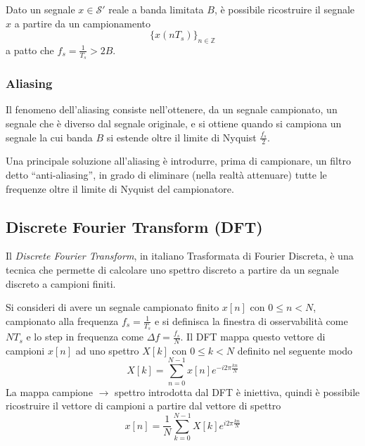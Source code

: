         \begin{theorem}
            Dato un segnale $x \in \mathcal{S}'$ reale a banda limitata $B$, è possibile ricostruire il segnale $x$ a partire da un campionamento
            \[
                \{x(n T_s)\}_{n \in \mathbb{Z}}
            \]
            a patto che $f_s = \frac{1}{T_s} > 2B$.
        \end{theorem}

        \subsubsection{Aliasing}
            Il fenomeno dell'aliasing consiste nell'ottenere, da un segnale campionato, un segnale che è diverso dal segnale originale, e si ottiene quando si campiona un segnale la cui banda $B$ si estende oltre il limite di Nyquist $\frac{f_s}{2}$.

            Una principale soluzione all'aliasing è introdurre, prima di campionare, un filtro detto ``anti-aliasing'', in grado di eliminare (nella realtà attenuare) tutte le frequenze oltre il limite di Nyquist del campionatore.


    \subsection{Discrete Fourier Transform (DFT)}
        Il \textit{Discrete Fourier Transform}, in italiano Trasformata di Fourier Discreta, è una tecnica che permette di calcolare uno spettro discreto a partire da un segnale discreto a campioni finiti.

        Si consideri di avere un segnale campionato finito $x[n]$ con $0 \leq n < N$, campionato alla frequenza $f_s = \frac{1}{T_s}$ e
        si definisca la finestra di osservabilità come $N T_s$ e lo step in frequenza come $\Delta f = \frac{f_s}{N}$.
        Il DFT mappa questo vettore di campioni $x[n]$ ad uno spettro $X[k]$ con $0 \leq k < N$ definito nel seguente modo
        \[
            X[k] = \sum_{n=0}^{N-1} x[n] e^{-i 2 \pi \frac{kn}{N}}
        \]
        La mappa campione $\rightarrow$ spettro introdotta dal DFT è iniettiva, quindi è possibile ricostruire il vettore di campioni a partire dal vettore di spettro
        \[
            x[n] = \frac{1}{N} \sum_{k=0}^{N-1} X[k] e^{i 2 \pi \frac{kn}{N}}
        \]

